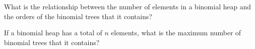 \documentclass{tufte-handout}
\begin{document}
\begin{questions}
\item What is the relationship between the number of elements in a
  binomial heap and the orders of the binomial trees that it contains?




\item If a binomial heap has a total of $n$ elements, what is the
  maximum number of binomial trees that it contains?





\end{questions}
\end{document}
